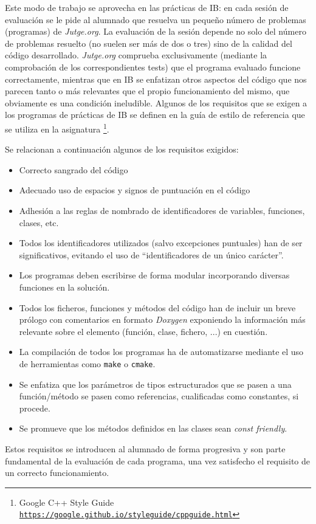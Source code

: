 \documentclass[twocolumn,twoside,a4paper, 10pt]{article}
\newcommand{\jutge}{\textit{Jutge.org}{}}           %
\begin{document}
Este modo de trabajo se aprovecha en las prácticas de IB: en cada sesión de evaluación se le pide al alumnado
que resuelva un pequeño número de problemas (programas) de \jutge{}.
La evaluación de la sesión depende no solo del número de problemas resuelto (no suelen ser más de dos o tres)
sino de la calidad del código desarrollado.
\jutge{} comprueba exclusivamente (mediante la comprobación de los correspondientes tests) que el programa evaluado 
funcione correctamente, mientras que en IB se enfatizan otros aspectos del código que nos parecen tanto o más 
relevantes que el propio funcionamiento del mismo, que obviamente es una condición ineludible.
Algunos de los requisitos que se exigen a los programas de prácticas de IB se definen en la guía de estilo de 
referencia que se utiliza en la asignatura 
\footnote{Google C++ Style Guide\\ \href{https://google.github.io/styleguide/cppguide.html}{\scriptsize{\texttt{https://google.github.io/styleguide/cppguide.html}}}}.

Se relacionan a continuación algunos de los requisitos exigidos:
\begin{itemize}
\item Correcto sangrado del código
\item Adecuado uso de espacios y signos de puntuación en el código
\item Adhesión a las reglas de nombrado de identificadores de variables, funciones, clases, etc.
\item Todos los identificadores utilizados (salvo excepciones puntuales) han de ser significativos, evitando el
      uso de ``identificadores de un único carácter''.
\item Los programas deben escribirse de forma modular incorporando diversas funciones en la solución.
\item Todos los ficheros, funciones y métodos del código han de incluir un breve prólogo con comentarios en
      formato \textit{Doxygen} exponiendo la información más relevante sobre el elemento (función, clase, fichero, ...) en
      cuestión.
\item La compilación de todos los programas ha de automatizarse mediante el uso de herramientas como \texttt{make} o \texttt{cmake}.
\item Se enfatiza que los parámetros de tipos estructurados que se pasen a una función/método se pasen como referencias,
      cualificadas como constantes, si procede.
\item Se promueve que los métodos definidos en las clases sean \textit{const friendly}.
\end{itemize}
Estos requisitos se introducen al alumnado de forma progresiva y son parte fundamental de la evaluación de cada programa, 
una vez satisfecho el requisito de un correcto funcionamiento.
\end{document}
